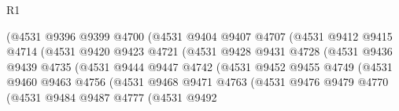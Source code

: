 \begin{lexlean}{R1}
\begin{coremodule}
                                  (@4531
                                    @9396
                                    @9399
                                    @4700
                                    (@4531
                                      @9404
                                      @9407
                                      @4707
                                      (@4531
                                        @9412
                                        @9415
                                        @4714
                                        (@4531
                                          @9420
                                          @9423
                                          @4721
                                          (@4531
                                            @9428
                                            @9431
                                            @4728
                                            (@4531
                                              @9436
                                              @9439
                                              @4735
                                              (@4531
                                                @9444
                                                @9447
                                                @4742
                                                (@4531
                                                  @9452
                                                  @9455
                                                  @4749
                                                  (@4531
                                                    @9460
                                                    @9463
                                                    @4756
                                                    (@4531
                                                      @9468
                                                      @9471
                                                      @4763
                                                      (@4531
                                                        @9476
                                                        @9479
                                                        @4770
                                                        (@4531
                                                          @9484
                                                          @9487
                                                          @4777
                                                          (@4531
                                                            @9492

\end{coremodule}
\end{lexlean}
